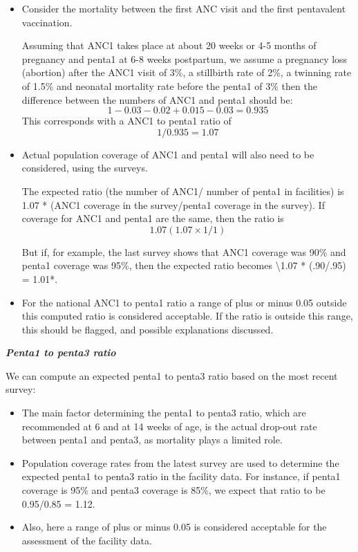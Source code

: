 \documentclass[
  english,
  letterpaper,
  DIV=11,
  numbers=noendperiod]{scrreprt}
\begin{document}
\begin{itemize}
\item
  Consider the mortality between the first ANC visit and the first
  pentavalent vaccination.

  Assuming that ANC1 takes place at about 20 weeks or 4-5 months of
  pregnancy and penta1 at 6-8 weeks postpartum, we assume a pregnancy
  loss (abortion) after the ANC1 visit of 3\%, a stillbirth rate of 2\%,
  a twinning rate of 1.5\% and neonatal mortality rate before the penta1
  of 3\% then the difference between the numbers of ANC1 and penta1
  should be: \[1 - 0.03 -0.02 + 0.015 - 0.03 = 0.935 \] This corresponds
  with a ANC1 to penta1 ratio of \[1/0.935 = 1.07\]
\item
  Actual population coverage of ANC1 and penta1 will also need to be
  considered, using the surveys.

  The expected ratio (the number of ANC1/ number of penta1 in
  facilities) is 1.07 * (ANC1 coverage in the survey/penta1 coverage in
  the survey). If coverage for ANC1 and penta1 are the same, then the
  ratio is \[ 1.07 (1.07 \times 1/1) \]

  But if, for example, the last survey shows that ANC1 coverage was 90\%
  and penta1 coverage was 95\%, then the expected ratio becomes
  \textbackslash1.07 * (.90/.95) = 1.01*.
\item
  For the national ANC1 to penta1 ratio a range of plus or minus 0.05
  outside this computed ratio is considered acceptable. If the ratio is
  outside this range, this should be flagged, and possible explanations
  discussed.
\end{itemize}

\textbf{\emph{Penta1 to penta3 ratio}}

We can compute an expected penta1 to penta3 ratio based on the most
recent survey:

\begin{itemize}
\item
  The main factor determining the penta1 to penta3 ratio, which are
  recommended at 6 and at 14 weeks of age, is the actual drop-out rate
  between penta1 and penta3, as mortality plays a limited role.
\item
  Population coverage rates from the latest survey are used to determine
  the expected penta1 to penta3 ratio in the facility data. For
  instance, if penta1 coverage is 95\% and penta3 coverage is 85\%, we
  expect that ratio to be 0.95/0.85 = 1.12.
\item
  Also, here a range of plus or minus 0.05 is considered acceptable for
  the assessment of the facility data.
\end{itemize}
\end{document}
